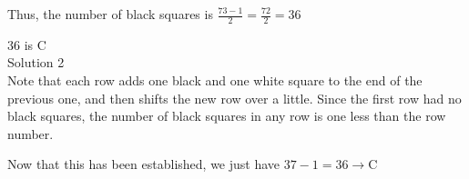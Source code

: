 Thus, the number of black squares is $\frac{73 - 1}{2} = \frac{72}{2} = 36$

36 is $\boxed{\text{C}}$
\\
Solution 2
\\
Note that each row adds one black and one white square to the end of the previous one, and then shifts the new row over a little. Since the first row had no black squares, the number of black squares in any row is one less than the row number.

Now that this has been established, we just have $37-1=36\rightarrow \boxed{\text{C}}$

